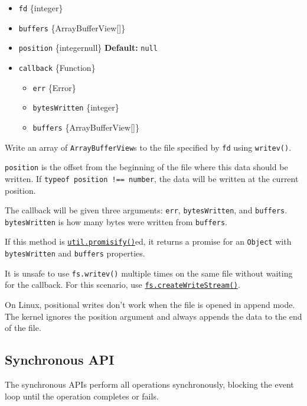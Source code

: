 \begin{itemize}
\tightlist
\item
  \texttt{fd} \{integer\}
\item
  \texttt{buffers} \{ArrayBufferView{[}{]}\}
\item
  \texttt{position} \{integer\textbar null\} \textbf{Default:}
  \texttt{null}
\item
  \texttt{callback} \{Function\}

  \begin{itemize}
  \tightlist
  \item
    \texttt{err} \{Error\}
  \item
    \texttt{bytesWritten} \{integer\}
  \item
    \texttt{buffers} \{ArrayBufferView{[}{]}\}
  \end{itemize}
\end{itemize}

Write an array of \texttt{ArrayBufferView}s to the file specified by
\texttt{fd} using \texttt{writev()}.

\texttt{position} is the offset from the beginning of the file where
this data should be written. If
\texttt{typeof\ position\ !==\ \textquotesingle{}number\textquotesingle{}},
the data will be written at the current position.

The callback will be given three arguments: \texttt{err},
\texttt{bytesWritten}, and \texttt{buffers}. \texttt{bytesWritten} is
how many bytes were written from \texttt{buffers}.

If this method is
\href{util.md\#utilpromisifyoriginal}{\texttt{util.promisify()}}ed, it
returns a promise for an \texttt{Object} with \texttt{bytesWritten} and
\texttt{buffers} properties.

It is unsafe to use \texttt{fs.writev()} multiple times on the same file
without waiting for the callback. For this scenario, use
\hyperref[fscreatewritestreampath-options]{\texttt{fs.createWriteStream()}}.

On Linux, positional writes don't work when the file is opened in append
mode. The kernel ignores the position argument and always appends the
data to the end of the file.

\subsection{Synchronous API}\label{synchronous-api}

The synchronous APIs perform all operations synchronously, blocking the
event loop until the operation completes or fails.

